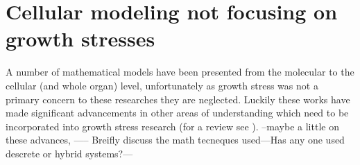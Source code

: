 \section{Cellular modeling not focusing on growth stresses}
A number of mathematical models have been presented from the
molecular to the cellular (and whole organ) level, unfortunately as
growth stress was not a primary concern to these researches they are neglected.
Luckily these works have made significant advancements in other areas of
understanding which need to be incorporated into growth stress research (for a review see \cite{ISI:000261731700022}). --maybe
a little on these advances, ----- Breifly discuss the math
tecneques used---Has any one used descrete or hybrid systems?---
